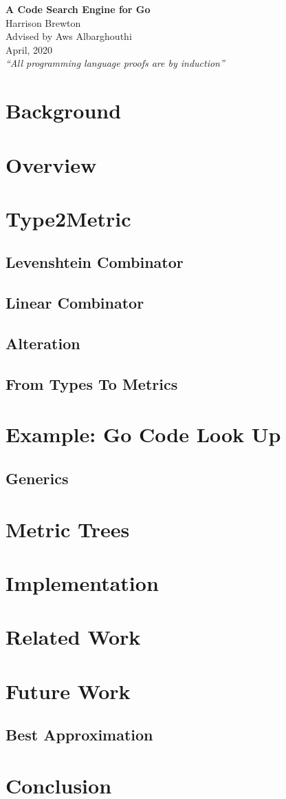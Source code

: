 \documentclass{article}
\begin{document}
{\centering \Huge \textbf{A Code Search Engine for Go} \\ 
\vspace{0.5cm}
\Large
Harrison Brewton \\
Advised by Aws Albarghouthi \\ 
April, 2020 \\
\normalsize
\vspace{0.1cm} \textit{``All programming language proofs are by induction''} \vspace{0.1cm} \par
}
\section{Background}
\section{Overview}
\section{Type2Metric}
\subsection{Levenshtein Combinator}

\subsection{Linear Combinator}

\subsection{Alteration}

\subsection{From Types To Metrics}

\section{Example: Go Code Look Up}
\subsection{Generics}
\section{Metric Trees}

\section{Implementation}
\section{Related Work}
\section{Future Work}
\subsection{Best Approximation}
\section{Conclusion}



\end{document}
